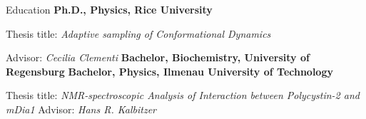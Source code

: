 \begin{rubric}{Education}
%
\entry*[2014 -- 2020]%
	\textbf{Ph.D., Physics, Rice University}
	\par Thesis title: \emph{Adaptive sampling of Conformational Dynamics}
  \par Advisor: \emph{Cecilia Clementi}
%
\entry*[2012 -- 2014]%
	\textbf{Bachelor, Biochemistry, University of Regensburg} 
%
\entry*[2012]%
  \textbf{Bachelor, Physics, Ilmenau University of Technology}
  \par Thesis title: \emph{NMR-spectroscopic Analysis of Interaction between Polycystin-2 and mDia1}  Advisor: \emph{Hans R. Kalbitzer}
\end{rubric}
